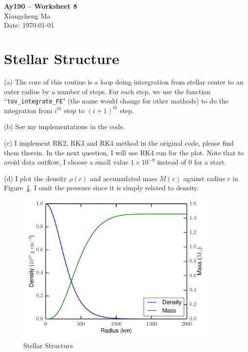\documentclass[11pt,letterpaper]{article}
\begin{document}
\begin{center}
\Large
{\bf Ay190 -- Worksheet 8} \\
\large
Xiangcheng Ma \\
Date: \today
\end{center}

\section*{Stellar Structure}
(a) The core of this routine is a loop doing intergration from stellar center to an outer radius by a number of steps. For each step, we use the function ``{\tt tov\_integrate\_FE}" (the name would change for other mathods) to do the integration from $i^{th}$ step to $(i+1)^{th}$ step.

(b) See my implementations in the code.

(c) I implement RK2, RK3 and RK4 method in the original code, please find them therein. In the next question, I will use RK4 run for the plot. Note that to avoid data outflow, I choose a small value $1\times10^{-8}$ instead of $0$ for a start.

(d) I plot the density $\rho(r)$ and accumulated mass $M(r)$ against radius $r$ in Figure~\ref{fig}. I omit the pressure since it is simply related to density.

\begin{figure}[ht]
\centering
\includegraphics[width=0.9\textwidth]{fig.pdf}
\caption{Stellar Structure}
\label{fig}
\end{figure}
\end{document}
